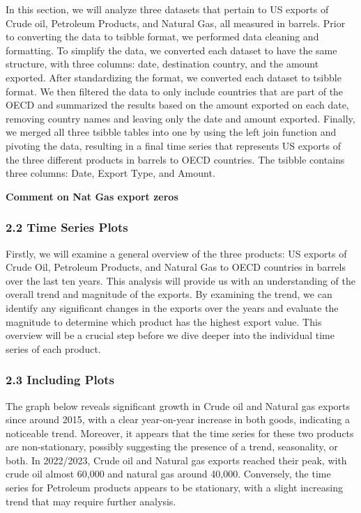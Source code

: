 \documentclass[
]{article}
\begin{document}
In this section, we will analyze three datasets that pertain to US
exports of Crude oil, Petroleum Products, and Natural Gas, all measured
in barrels. Prior to converting the data to tsibble format, we performed
data cleaning and formatting. To simplify the data, we converted each
dataset to have the same structure, with three columns: date,
destination country, and the amount exported. After standardizing the
format, we converted each dataset to tsibble format. We then filtered
the data to only include countries that are part of the OECD and
summarized the results based on the amount exported on each date,
removing country names and leaving only the date and amount exported.
Finally, we merged all three tsibble tables into one by using the left
join function and pivoting the data, resulting in a final time series
that represents US exports of the three different products in barrels to
OECD countries. The tsibble contains three columns: Date, Export Type,
and Amount.

\textbf{Comment on Nat Gas export zeros}

\hypertarget{time-series-plots}{%
\subsubsection{2.2 Time Series Plots}\label{time-series-plots}}

Firstly, we will examine a general overview of the three products: US
exports of Crude Oil, Petroleum Products, and Natural Gas to OECD
countries in barrels over the last ten years. This analysis will provide
us with an understanding of the overall trend and magnitude of the
exports. By examining the trend, we can identify any significant changes
in the exports over the years and evaluate the magnitude to determine
which product has the highest export value. This overview will be a
crucial step before we dive deeper into the individual time series of
each product.

\hypertarget{including-plots}{%
\subsubsection{2.3 Including Plots}\label{including-plots}}

The graph below reveals significant growth in Crude oil and Natural gas
exports since around 2015, with a clear year-on-year increase in both
goods, indicating a noticeable trend. Moreover, it appears that the time
series for these two products are non-stationary, possibly suggesting
the presence of a trend, seasonality, or both. In 2022/2023, Crude oil
and Natural gas exports reached their peak, with crude oil almost 60,000
and natural gas around 40,000. Conversely, the time series for Petroleum
products appears to be stationary, with a slight increasing trend that
may require further analysis.
\end{document}
